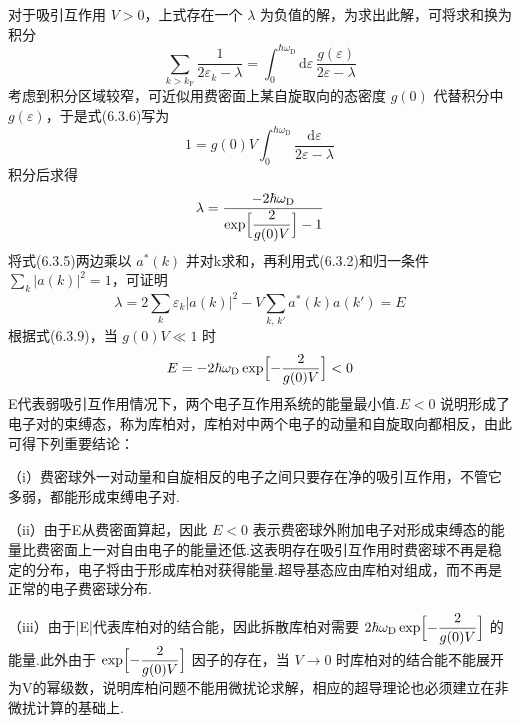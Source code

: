对于吸引互作用 $V>0$，上式存在一个 $\lambda$ 为负值的解，为求出此解，可将求和换为积分
\begin{equation}
  \sum_{k>k_{\mathrm{F}}}\frac{1}{2\varepsilon_{k}-\lambda}
  =\int_{0}^{\hbar\omega_{\mathrm{D}}}\mathrm{d}\varepsilon\,
  \frac{g(\varepsilon)}{2\varepsilon-\lambda}
\end{equation}
考虑到积分区域较窄，可近似用费密面上某自旋取向的态密度 $g(0)$ 代替积分中 $g(\varepsilon)$，于是式(6.3.6)写为
\begin{equation}
  1=g(0)V\int_{0}^{\hbar\omega_{\mathrm{D}}}\frac{\mathrm{d}\varepsilon}{2\varepsilon-\lambda}
\end{equation}
积分后求得
\begin{equation}
  \lambda=\frac{-2\hbar\omega_{\mathrm{D}}}
  {\exp\Bigl[\dfrac{2}{g(0)V}\Bigr]-1}
\end{equation}
将式(6.3.5)两边乘以 $a^{*}(k)$ 并对k求和，再利用式(6.3.2)和归一条件 $\sum_{k}|a(k)|^{2}=1$，可证明
\begin{equation}
  \lambda=2\sum_{k}\varepsilon_{k}|a(k)|^{2}
  -V\sum_{k,\,k'}a^{*}(k)a(k')=E
\end{equation}
根据式(6.3.9)，当 $g(0)V\ll1$ 时
\begin{equation}
  E=-2\hbar\omega_{\mathrm{D}}\exp\Bigl[-\frac{2}{g(0)V}\Bigr]<0
\end{equation}
E代表弱吸引互作用情况下，两个电子互作用系统的能量最小值.$E<0$ 说明形成了电子对的束缚态，称为库柏对，库柏对中两个电子的动量和自旋取向都相反，由此可得下列重要结论：

（i）费密球外一对动量和自旋相反的电子之间只要存在净的吸引互作用，不管它多弱，都能形成束缚电子对.

（ii）由于E从费密面算起，因此 $E<0$ 表示费密球外附加电子对形成束缚态的能量比费密面上一对自由电子的能量还低.这表明存在吸引互作用时费密球不再是稳定的分布，电子将由于形成库柏对获得能量.超导基态应由库柏对组成，而不再是正常的电子费密球分布.

（iii）由于|E|代表库柏对的结合能，因此拆散库柏对需要 $2\hbar\omega_{\mathrm{D}}\exp\Bigl[-\dfrac{2}{g(0)V}\Bigr]$ 的能量.此外由于 $\exp\Bigl[-\dfrac{2}{g(0)V}\Bigr]$ 因子的存在，当 $V\to0$ 时库柏对的结合能不能展开为V的幂级数，说明库柏问题不能用微扰论求解，相应的超导理论也必须建立在非微扰计算的基础上.

